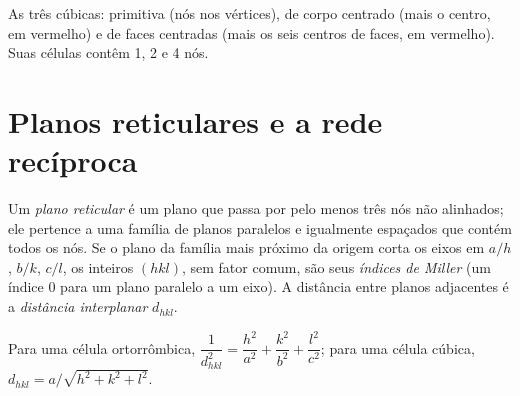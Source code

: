 \begin{omfigure}

{\small As três  cúbicas: primitiva (nós nos vértices), de corpo
centrado (mais o centro, em vermelho) e de faces centradas (mais os seis
centros de faces, em vermelho). Suas células contêm 1, 2 e 4 nós.}
\end{omfigure}

\section{Planos reticulares e a rede recíproca}

\begin{definition}\label{def:b3:x-ray-diffraction:miller}
Um \emph{plano reticular} é um plano que passa por pelo menos
três nós não alinhados; ele pertence a uma família de planos paralelos e
igualmente espaçados que contém todos os nós. Se o plano da família mais
próximo da origem corta os eixos em $a/h$, $b/k$, $c/l$, os inteiros $(hkl)$, sem
fator comum, são seus \emph{índices de Miller} (um índice 0
para um plano paralelo a um eixo). A distância entre planos adjacentes é a
\emph{distância interplanar} $d_{hkl}$.
\end{definition}

\begin{proposition}\label{prop:b3:x-ray-diffraction:spacing}
Para uma célula ortorrômbica, $\dfrac{1}{d_{hkl}^2} = \dfrac{h^2}{a^2} + \dfrac{k^2}{b^2} +
\dfrac{l^2}{c^2}$; para uma célula cúbica, $d_{hkl} = a/\sqrt{h^2 + k^2 + l^2}$.
\end{proposition}

